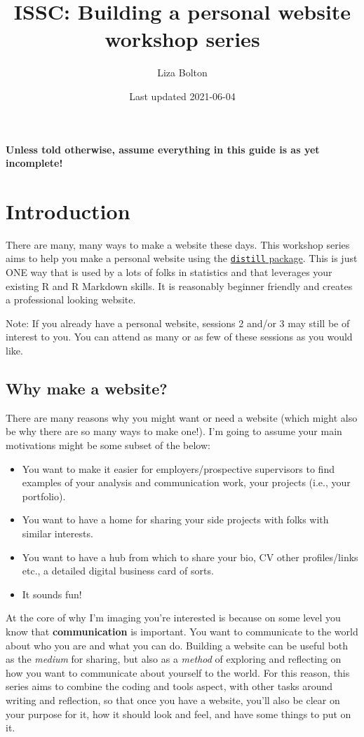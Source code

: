 \documentclass[
]{article}
\title{ISSC: Building a personal website workshop series}
\author{Liza Bolton}
\date{Last updated 2021-06-04}
\providecommand{\tightlist}{%
  \setlength{\itemsep}{0pt}\setlength{\parskip}{0pt}}
\begin{document}
\maketitle

{
\setcounter{tocdepth}{2}
\tableofcontents
}
\textbf{Unless told otherwise, assume everything in this guide is as yet incomplete!}

\hypertarget{introduction}{%
\section{Introduction}\label{introduction}}

There are many, many ways to make a website these days. This workshop series aims to help you make a personal website using the \href{https://rstudio.github.io/distill/}{\texttt{distill} package}. This is just ONE way that is used by a lots of folks in statistics and that leverages your existing R and R Markdown skills. It is reasonably beginner friendly and creates a professional looking website.

Note: If you already have a personal website, sessions 2 and/or 3 may still be of interest to you. You can attend as many or as few of these sessions as you would like.

\hypertarget{why-make-a-website}{%
\subsection{Why make a website?}\label{why-make-a-website}}

There are many reasons why you might want or need a website (which might also be why there are so many ways to make one!). I'm going to assume your main motivations might be some subset of the below:

\begin{itemize}
\tightlist
\item
  You want to make it easier for employers/prospective supervisors to find examples of your analysis and communication work, your projects (i.e., your portfolio).
\item
  You want to have a home for sharing your side projects with folks with similar interests.
\item
  You want to have a hub from which to share your bio, CV other profiles/links etc., a detailed digital business card of sorts.
\item
  It sounds fun!
\end{itemize}

At the core of why I'm imaging you're interested is because on some level you know that \textbf{communication} is important. You want to communicate to the world about who you are and what you can do. Building a website can be useful both as the \emph{medium} for sharing, but also as a \emph{method} of exploring and reflecting on how you want to communicate about yourself to the world. For this reason, this series aims to combine the coding and tools aspect, with other tasks around writing and reflection, so that once you have a website, you'll also be clear on your purpose for it, how it should look and feel, and have some things to put on it.
\end{document}
